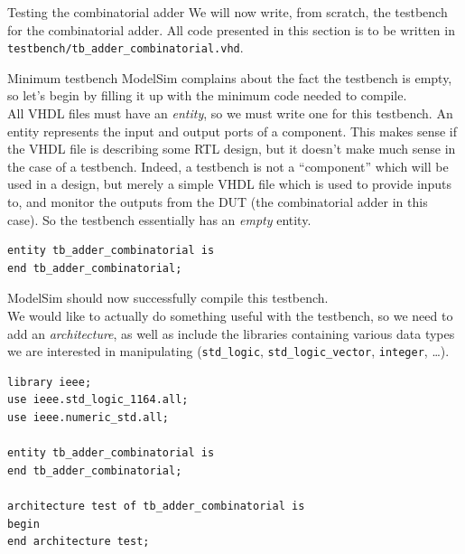 \documentclass[lab]{course}
\begin{document}
\clearpage

\begin{section}{Testing the combinatorial adder}
    We will now write, from scratch, the testbench for the combinatorial adder. All code presented in this section is to be written in \verb+testbench/tb_adder_combinatorial.vhd+.

    \begin{subsection}{Minimum testbench}
        ModelSim complains about the fact the testbench is empty, so let's begin by filling it up with the minimum code needed to compile. \\

        All VHDL files must have an \emph{entity}, so we must write one for this testbench. An entity represents the input and output ports of a component. This makes sense if the VHDL file is describing some RTL design, but it doesn't make much sense in the case of a testbench. Indeed, a testbench is not a ``component'' which will be used in a design, but merely a simple VHDL file which is used to provide inputs to, and monitor the outputs from the DUT (the combinatorial adder in this case). So the testbench essentially has an \emph{empty} entity.

        \begin{lstlisting}[caption={Minimum testbench (only empty entity)}, captionpos=b, label={lst:combinatorial_minimum_testbench}]
entity tb_adder_combinatorial is
end tb_adder_combinatorial;
        \end{lstlisting}
    \end{subsection}

    ModelSim should now successfully compile this testbench. \\

    We would like to actually do something useful with the testbench, so we need to add an \emph{architecture}, as well as include the libraries containing various data types we are interested in manipulating (\verb+std_logic+, \verb+std_logic_vector+, \verb+integer+, \ldots).

    \begin{lstlisting}[caption={Add libraries \& empty architecture}, captionpos=b, label={lst:combinatorial_add_libraries_and_empty_architecture}]
library ieee;
use ieee.std_logic_1164.all;
use ieee.numeric_std.all;

entity tb_adder_combinatorial is
end tb_adder_combinatorial;

architecture test of tb_adder_combinatorial is
begin
end architecture test;
    \end{lstlisting}


\end{section}
\end{document}
